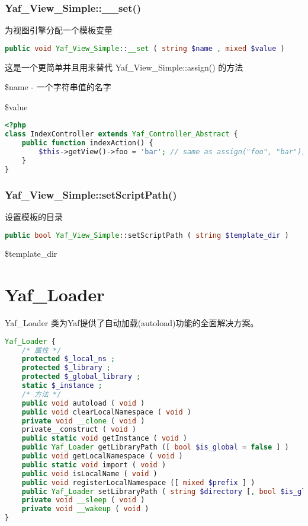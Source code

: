 \subsection{Yaf\_View\_Simple::\_\_set()}

为视图引擎分配一个模板变量

\begin{lstlisting}[language=PHP]
public void Yaf_View_Simple::__set ( string $name , mixed $value )
\end{lstlisting}


这是一个更简单并且用来替代 Yaf\_View\_Simple::assign() 的方法

\begin{compactitem}
\item \$name - 一个字符串值的名字

\item \$value

\end{compactitem}

\begin{lstlisting}[language=PHP]
<?php
class IndexController extends Yaf_Controller_Abstract {
    public function indexAction() {
        $this->getView()->foo = 'bar'; // same as assign("foo", "bar");
    }
}
\end{lstlisting}

\subsection{Yaf\_View\_Simple::setScriptPath()}

设置模板的目录

\begin{lstlisting}[language=PHP]
public bool Yaf_View_Simple::setScriptPath ( string $template_dir )
\end{lstlisting}


\begin{compactitem}
\item \$template\_dir
\end{compactitem}


\chapter{Yaf\_Loader}

Yaf\_Loader 类为Yaf提供了自动加载(autoload)功能的全面解决方案。

\begin{lstlisting}[language=PHP]
Yaf_Loader {
    /* 属性 */
    protected $_local_ns ;
    protected $_library ;
    protected $_global_library ;
    static $_instance ;
    /* 方法 */
    public void autoload ( void )
    public void clearLocalNamespace ( void )
    private void __clone ( void )
    private__construct ( void )
    public static void getInstance ( void )
    public Yaf_Loader getLibraryPath ([ bool $is_global = false ] )
    public void getLocalNamespace ( void )
    public static void import ( void )
    public void isLocalName ( void )
    public void registerLocalNamespace ([ mixed $prefix ] )
    public Yaf_Loader setLibraryPath ( string $directory [, bool $is_global = false ] )
    private void __sleep ( void )
    private void __wakeup ( void )
}
\end{lstlisting}


